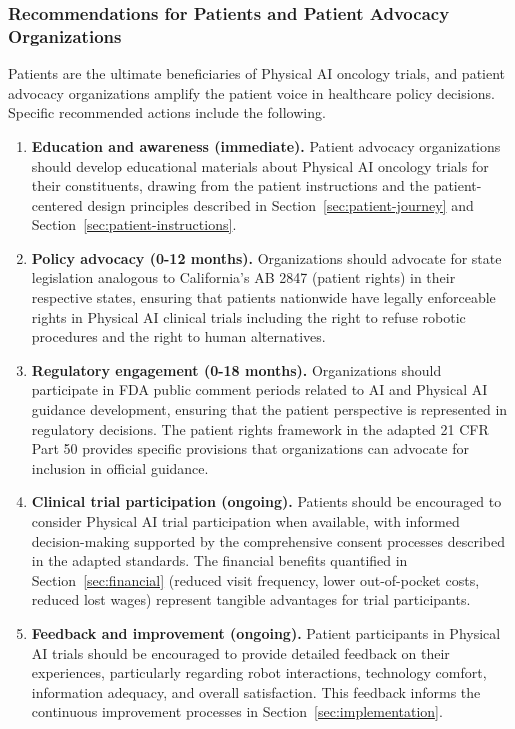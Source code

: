 \subsubsection{Recommendations for Patients and Patient Advocacy Organizations}

Patients are the ultimate beneficiaries of Physical AI oncology trials, and
patient advocacy organizations amplify the patient voice in healthcare policy
decisions. Specific recommended actions include the following.

\begin{enumerate}[nosep]
  \item \textbf{Education and awareness (immediate).} Patient advocacy
    organizations should develop educational materials about Physical AI
    oncology trials for their constituents, drawing from the patient
    instructions \cite{patient-instructions-paper} and the patient-centered
    design principles described in Section~\ref{sec:patient-journey} and
    Section~\ref{sec:patient-instructions}.

  \item \textbf{Policy advocacy (0-12 months).} Organizations should advocate
    for state legislation analogous to California's AB 2847 (patient rights)
    in their respective states, ensuring that patients nationwide have legally
    enforceable rights in Physical AI clinical trials including the right to
    refuse robotic procedures and the right to human alternatives.

  \item \textbf{Regulatory engagement (0-18 months).} Organizations should
    participate in FDA public comment periods related to AI and Physical AI
    guidance development, ensuring that the patient perspective is represented
    in regulatory decisions. The patient rights framework in the adapted 21
    CFR Part 50 \cite{cfr50-adapt} provides specific provisions that
    organizations can advocate for inclusion in official guidance.

  \item \textbf{Clinical trial participation (ongoing).} Patients should be
    encouraged to consider Physical AI trial participation when available,
    with informed decision-making supported by the comprehensive consent
    processes described in the adapted standards. The financial benefits
    quantified in Section~\ref{sec:financial} (reduced visit frequency, lower
    out-of-pocket costs, reduced lost wages) represent tangible advantages
    for trial participants.

  \item \textbf{Feedback and improvement (ongoing).} Patient participants in
    Physical AI trials should be encouraged to provide detailed feedback on
    their experiences, particularly regarding robot interactions, technology
    comfort, information adequacy, and overall satisfaction. This feedback informs the continuous improvement processes in Section~\ref{sec:implementation}.
\end{enumerate}

